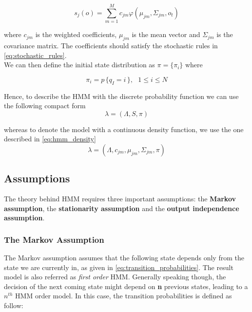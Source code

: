 \begin{equation}
	s_{j}(o) = \sum_{m = 1}^{M} c_{jm}\varphi (\mu_{jm}, \Sigma_{jm}, o_{t})
\end{equation}

\noindent where $c_{jm}$ is the weighted coefficients, $\mu_{jm}$ is the mean vector and $\Sigma_{jm}$ is the covariance matrix. The coefficients should satisfy the stochastic rules in \ref{eq:stochastic_rules}. \\
\noindent We can then define the initial state distribution as $\pi = \{\pi_{i}\}$ where

\begin{equation}
	\pi_{i} = p \, \{ q_{I} = i \, \}, \,\,\,\, 1 \leq i \leq N
\end{equation}

\noindent Hence, to describe the HMM with the discrete probability function we can use the following compact form
\begin{equation}
\label{eq:hmm_discrete}
	\lambda = (\Lambda, S, \pi )
\end{equation}

\noindent whereas to denote the model with a continuous density function, we use the one described in \ref{eq:hmm_density}
\begin{equation}
\label{eq:hmm_density}
\lambda = (\Lambda, c_{jm}, \mu_{jm}, \Sigma_{jm}, \pi )
\end{equation}

\subsection{Assumptions}
\label{sub:assumptions_hmm}
The theory behind HMM requires three important assumptions: the \textbf{Markov assumption}, the \textbf{stationarity assumption} and the \textbf{output independence assumption}.

\subsubsection{The Markov Assumption}
The Markov assumption assumes that the following state depends only from the state we are currently in, as given in \ref{eq:transition_probabilities}. The result model is also referred as \textit{first order} HMM. Generally speaking though, the decision of the next coming state might depend on \textbf{n} previous states, leading to a $n^{th}$ HMM order model. In this case, the transition probabilities is defined as follow:

